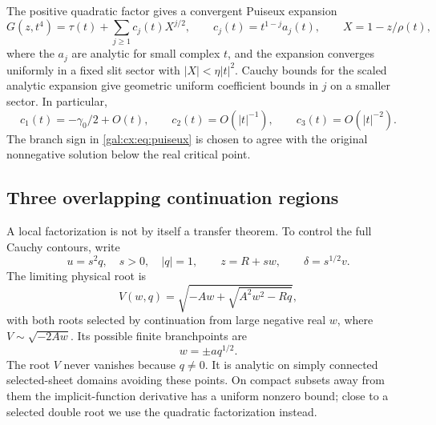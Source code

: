 \documentclass[11pt,letterpaper]{article}
\numberwithin{equation}{section}
\theoremstyle{definition}\newtheorem{definition}[theorem]{Definition}
\theoremstyle{remark}\newtheorem{remark}[theorem]{Remark}
\begin{document}
The positive quadratic factor gives a convergent Puiseux expansion
\begin{equation}\label{gal:cx:eq:puiseux}
G(z,t^4)=\tau(t)+\sum_{j\ge1}c_j(t)X^{j/2},
\qquad c_j(t)=t^{1-j}a_j(t),\qquad X=1-z/\rho(t),
\end{equation}
where the $a_j$ are analytic for small complex $t$, and the expansion converges uniformly in a fixed slit sector with $|X|<\eta|t|^2$. Cauchy bounds for the scaled analytic expansion give geometric uniform coefficient bounds in $j$ on a smaller sector. In particular,
\begin{equation}\label{gal:cx:eq:c-bounds}
c_1(t)=-\gamma_0/2+O(t),\qquad c_2(t)=O(|t|^{-1}),
\qquad c_3(t)=O(|t|^{-2}).
\end{equation}
The branch sign in \eqref{gal:cx:eq:puiseux} is chosen to agree with the original nonnegative solution below the real critical point.

\subsection{Three overlapping continuation regions}
A local factorization is not by itself a transfer theorem. To control the full Cauchy contours, write
\[
u=s^2q,\quad s>0,\quad |q|=1,\qquad z=R+sw,\qquad \delta=s^{1/2}v.
\]
The limiting physical root is
\begin{equation}\label{gal:cx:eq:V}
V(w,q)=\sqrt{-Aw+\sqrt{A^2w^2-Rq}},
\end{equation}
with both roots selected by continuation from large negative real $w$, where $V\sim\sqrt{-2Aw}$. Its possible finite branchpoints are
\begin{equation}\label{gal:cx:eq:branchpoints}
w=\pm a q^{1/2}.
\end{equation}
The root $V$ never vanishes because $q\ne0$. It is analytic on simply connected selected-sheet domains avoiding these points. On compact subsets away from them the implicit-function derivative has a uniform nonzero bound; close to a selected double root we use the quadratic factorization instead.
\end{document}
